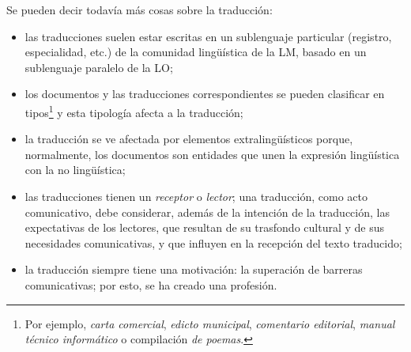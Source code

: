 Se pueden decir todavía más cosas sobre la traducción: \begin{itemize} \item las traducciones suelen estar escritas en un sublenguaje particular (registro, especialidad, etc.) de la comunidad lingüística de la LM, basado en un sublenguaje paralelo de la LO; \item los documentos y las traducciones correspondientes se pueden clasificar en tipos\footnote{Por ejemplo, \emph{carta comercial}, \emph{edicto municipal}, \emph{comentario editorial}, \emph{manual técnico informático} o compilación \emph{de poemas}. } y esta tipología afecta a la traducción; \item la traducción se ve afectada por elementos extralingüísticos porque, normalmente, los documentos son entidades que unen la expresión lingüística con la no lingüística; \item las traducciones tienen un \emph{receptor} o \emph{lector}; una traducción, como acto comunicativo, debe considerar, además de la intención de la traducción, las expectativas de los lectores, que resultan de su trasfondo cultural y de sus necesidades comunicativas, y que influyen en la recepción del texto traducido; \item la traducción siempre tiene una motivación: la superación de barreras comunicativas; por esto, se ha creado una profesión. \end{itemize} 


